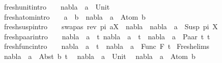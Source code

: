 \begin{isabellebody}
\ \ fresh{\isacharunderscore}{\kern0pt}unit{\isacharbrackleft}{\kern0pt}intro{\isacharbang}{\kern0pt}{\isacharbrackright}{\kern0pt}{\isacharcolon}{\kern0pt}\ \ \ \ {\isachardoublequoteopen}nabla\ {\isasymturnstile}\ a\ {\isasymsharp}\ Unit{\isachardoublequoteclose}\ {\isacharbar}{\kern0pt}\isanewline
\ \ fresh{\isacharunderscore}{\kern0pt}atom{\isacharbrackleft}{\kern0pt}intro{\isacharbang}{\kern0pt}{\isacharbrackright}{\kern0pt}{\isacharcolon}{\kern0pt}\ \ \ \ {\isachardoublequoteopen}a\ {\isasymnoteq}\ b\ {\isasymLongrightarrow}\ nabla\ {\isasymturnstile}\ a\ {\isasymsharp}\ Atom\ b{\isachardoublequoteclose}\ {\isacharbar}{\kern0pt}\isanewline
\ \ fresh{\isacharunderscore}{\kern0pt}susp{\isacharbrackleft}{\kern0pt}intro{\isacharbang}{\kern0pt}{\isacharbrackright}{\kern0pt}{\isacharcolon}{\kern0pt}\ \ \ \ {\isachardoublequoteopen}{\isacharparenleft}{\kern0pt}swapas\ {\isacharparenleft}{\kern0pt}rev\ pi{\isacharparenright}{\kern0pt}\ a{\isacharcomma}{\kern0pt}X{\isacharparenright}{\kern0pt}\ {\isasymin}\ nabla\ {\isasymLongrightarrow}\ nabla\ {\isasymturnstile}\ a\ {\isasymsharp}\ Susp\ pi\ X{\isachardoublequoteclose}\ {\isacharbar}{\kern0pt}\isanewline
\ \ fresh{\isacharunderscore}{\kern0pt}paar{\isacharbrackleft}{\kern0pt}intro{\isacharbang}{\kern0pt}{\isacharbrackright}{\kern0pt}{\isacharcolon}{\kern0pt}\ \ \ \ {\isachardoublequoteopen}{\isasymlbrakk}nabla\ {\isasymturnstile}\ a\ {\isasymsharp}\ t{}{\isacharsemicolon}{\kern0pt}\ nabla\ {\isasymturnstile}\ a\ {\isasymsharp}\ t{}{\isasymrbrakk}\ {\isasymLongrightarrow}\ nabla\ {\isasymturnstile}\ a\ {\isasymsharp}\ Paar\ t{}\ t{}{\isachardoublequoteclose}\ {\isacharbar}{\kern0pt}\isanewline
\ \ fresh{\isacharunderscore}{\kern0pt}func{\isacharbrackleft}{\kern0pt}intro{\isacharbang}{\kern0pt}{\isacharbrackright}{\kern0pt}{\isacharcolon}{\kern0pt}\ \ \ \ {\isachardoublequoteopen}nabla\ {\isasymturnstile}\ a\ {\isasymsharp}\ t\ {\isasymLongrightarrow}\ nabla\ {\isasymturnstile}\ a\ {\isasymsharp}\ Func\ F\ t{\isachardoublequoteclose}\isanewline
\isanewline
{}\isamarkupfalse%
\ Fresh{\isacharunderscore}{\kern0pt}elims{\isacharcolon}{\kern0pt}\isanewline
\ \ {\isachardoublequoteopen}nabla\ {\isasymturnstile}\ a\ {\isasymsharp}\ Abst\ b\ t{\isachardoublequoteclose}\isanewline
\ \ {\isachardoublequoteopen}nabla\ {\isasymturnstile}\ a\ {\isasymsharp}\ Unit{\isachardoublequoteclose}\isanewline
\ \ {\isachardoublequoteopen}nabla\ {\isasymturnstile}\ a\ {\isasymsharp}\ Atom\ b{\isachardoublequoteclose}\isanewline

\end{isabellebody}
